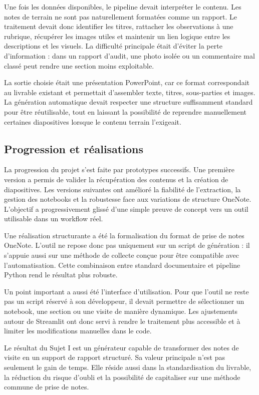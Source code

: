 \documentclass[12pt]{article}
\begin{document}
Une fois les données disponibles, le pipeline devait interpréter le contenu. Les notes de terrain ne sont pas naturellement formatées comme un rapport. Le traitement devait donc identifier les titres, rattacher les observations à une rubrique, récupérer les images utiles et maintenir un lien logique entre les descriptions et les visuels. La difficulté principale était d’éviter la perte d’information : dans un rapport d’audit, une photo isolée ou un commentaire mal classé peut rendre une section moins exploitable. 

La sortie choisie était une présentation PowerPoint, car ce format correspondait au livrable existant et permettait d’assembler texte, titres, sous-parties et images. La génération automatique devait respecter une structure suffisamment standard pour être réutilisable, tout en laissant la possibilité de reprendre manuellement certaines diapositives lorsque le contenu terrain l’exigeait. 

\subsection{Progression et réalisations}

La progression du projet s’est faite par prototypes successifs. Une première version a permis de valider la récupération des contenus et la création de diapositives. Les versions suivantes ont amélioré la fiabilité de l’extraction, la gestion des notebooks et la robustesse face aux variations de structure OneNote. L’objectif a progressivement glissé d’une simple preuve de concept vers un outil utilisable dans un workflow réel. 

Une réalisation structurante a été la formalisation du format de prise de notes OneNote. L’outil ne repose donc pas uniquement sur un script de génération : il s’appuie aussi sur une méthode de collecte conçue pour être compatible avec l’automatisation. Cette combinaison entre standard documentaire et pipeline Python rend le résultat plus robuste. 

Un point important a aussi été l’interface d’utilisation. Pour que l’outil ne reste pas un script réservé à son développeur, il devait permettre de sélectionner un notebook, une section ou une visite de manière dynamique. Les ajustements autour de Streamlit ont donc servi à rendre le traitement plus accessible et à limiter les modifications manuelles dans le code. 

Le résultat du Sujet I est un générateur capable de transformer des notes de visite en un support de rapport structuré. Sa valeur principale n’est pas seulement le gain de temps. Elle réside aussi dans la standardisation du livrable, la réduction du risque d’oubli et la possibilité de capitaliser sur une méthode commune de prise de notes. 
\end{document}
